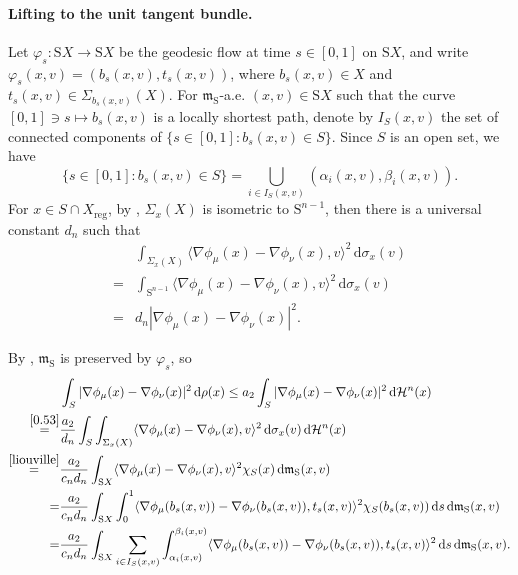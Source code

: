 \documentclass[a4paper,11pt]{article}
\numberwithin{equation}{section}
\theoremstyle{plain}
\theoremstyle{definition}
\theoremstyle{remark}
\newcommand{\mm}{\mathfrak m}
\newcommand{\rS}{\mathrm{S}}
\renewcommand{\d}{{\mathrm d}}
\begin{document}
	
	\paragraph{Lifting to the unit tangent bundle.}
	Let $\varphi_s: {\mathrm S}X\rightarrow{\mathrm S}X$ be the geodesic flow at time $s\in[0,1]$ on $\mathrm{S}X$, and write $\varphi_s(x,v)=(b_s(x,v),t_s(x,v))$, where $b_s(x,v)\in X$ and $t_s(x,v)\in {\Sigma_{b_s(x,v)}(X)}$. For $\mm_\mathrm S$-a.e. $(x,v)\in {\mathrm S}X$ such that the curve $[0,1]\ni s \mapsto b_s(x,v)$ is a locally shortest path,  denote by $I_S(x,v)$ the set of connected components of $\{s\in[0,1]: b_s(x,v)\in S\}$. Since $S$ is an open set, we have
	\begin{equation*}
		\{s\in [0,1]: b_s(x,v)\in S\}=\bigcup_{i\in I_S(x,v)}(\alpha_i(x,v),\beta_i(x,v)).
	\end{equation*}
	For  $x\in S \cap X_{\mathrm{reg}}$, by \cite[Theorem 10.8.4]{zbMATH01626771}, $\Sigma_x(X)$ is isometric to $\mathrm S^{n-1}$, then  there is a universal constant $d_n$ such that
	\begin{equation}\label{0.53}
		\begin{aligned}
			&\int_{\Sigma_x(X)} \langle\nabla\phi_\mu(x)-\nabla\phi_\nu(x),v\rangle^2\,\d\sigma_x(v)\\
			=&\int_{{\rS}^{n-1}}\langle\nabla\phi_\mu(x)-\nabla\phi_\nu(x),v\rangle^2\,\d\sigma_x(v)\\
			=&d_n |\nabla\phi_\mu(x)-\nabla\phi_\nu(x)|^2.
		\end{aligned}
	\end{equation}

	
	By \cite[Section 3.6]{zbMATH07328107},   $\mm_\rS$ is preserved by $\varphi_s$,  so
	\begin{equation}\label{0.54}
		\begin{aligned}
			&\int_S |\nabla\phi_\mu(x)-\nabla\phi_\nu(x)|^2\,\d\rho(x)
			\leq  a_2\int_S |\nabla\phi_\mu(x)-\nabla\phi_\nu(x)|^2\,\d\mathcal{H}^n(x)\\
			\mathop{=}^{\eqref{0.53}}&\frac{a_2}{d_n}\int_{S}\int_{\Sigma_x(X)}\langle\nabla\phi_\mu(x)-\nabla\phi_\nu(x),v\rangle^2\,\d\sigma_x(v)\,\d\mathcal{H}^n(x)\\
			\mathop{=}^{\eqref{liouville}}&\frac{a_2}{c_nd_n}\int_{{\rS}X}\langle\nabla\phi_\mu(x)-\nabla\phi_\nu(x),v\rangle^2\chi_S(x)\,\d\mm_\rS(x,v)\\
			=&\frac{a_2}{c_nd_n}\int_{{\rS}X}\int_0^1\langle\nabla\phi_\mu(b_s(x,v))-\nabla\phi_\nu(b_s(x,v)),t_s(x,v)\rangle^2\chi_S(b_s(x,v))\,\d s \,\d\mm_\rS(x,v)\\
			=&\frac{a_2}{c_nd_n}\int_{{\rS}X}\sum_{i\in  I_S(x,v)}\int_{\alpha_i(x,v)}^{\beta_i(x,v)}\langle\nabla\phi_\mu(b_s(x,v))-\nabla\phi_\nu(b_s(x,v)),t_s(x,v)\rangle^2\,\d s \,\d\mm_\rS(x,v).\\	
		\end{aligned}
	\end{equation}
	
\end{document}
